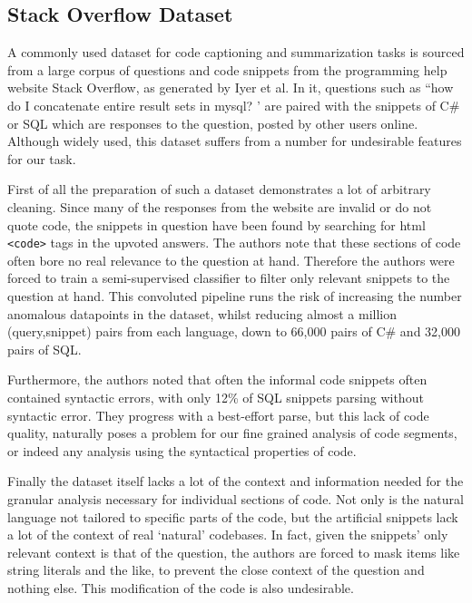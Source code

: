 \subsection{Stack Overflow Dataset}

A commonly used dataset for code captioning and summarization tasks is sourced from a large corpus of questions and code snippets from the programming help website Stack Overflow, as generated by Iyer et al\cite{iyer_summarizing_2016}. In it, questions such as ``how do I concatenate entire result sets in mysql? ' are paired with the snippets of C\# or SQL which are responses to the question, posted by other users online.
Although widely used, this dataset suffers from a number for undesirable features for our task. 

First of all the preparation of such a dataset demonstrates a lot of arbitrary cleaning.
Since many of the responses from the website are invalid or do not quote code, the snippets in question have been found by searching for html \texttt{<code>} tags in the upvoted answers. 
The authors note that these sections of code often bore no real relevance to the question at hand. Therefore the authors were forced to train a semi-supervised classifier to filter only relevant snippets to the question at hand.
This convoluted pipeline runs the risk of increasing the number anomalous datapoints in the dataset, whilst reducing almost a million (query,snippet) pairs from each language, down to 66,000 pairs  of C\# and 32,000 pairs of SQL.

Furthermore, the authors noted that often the informal code snippets often contained syntactic errors, with only 12\% of SQL snippets parsing without syntactic error. They progress with a best-effort parse, but this
 lack of code quality, naturally poses a problem for our fine grained analysis of code segments, or indeed any analysis using the syntactical properties of code.

Finally the dataset itself lacks a lot of the context and information needed for the granular analysis necessary for individual sections of code. Not only is the natural language not tailored to specific parts of the code, but the artificial snippets lack a lot of the context of real `natural' codebases. In fact, given the snippets' only relevant context is that of the question, the authors are forced to mask items like string literals and the like, to prevent the close context of the question and nothing else. This modification of the code is also undesirable.


